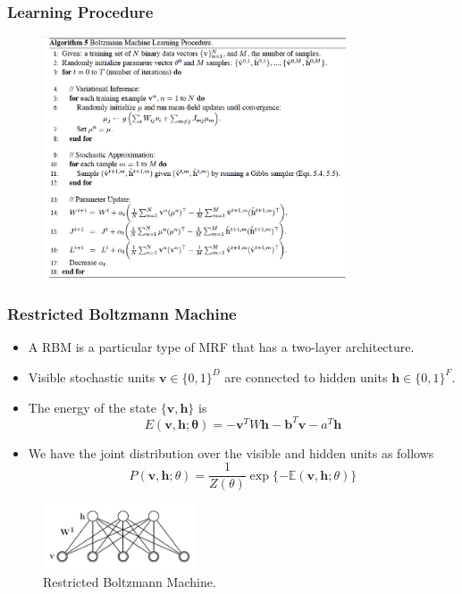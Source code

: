 \documentclass{beamer}
\begin{document}
\begin{frame}
\frametitle{Learning Procedure}
\begin{figure}
\centering
  \includegraphics[width=0.8\textwidth]{figs/learning.png}
\end{figure}
\end{frame}


\begin{frame}
\frametitle{Restricted Boltzmann Machine}
\begin{itemize}
\item A RBM is a particular type of MRF that has a two-layer architecture.
\item Visible stochastic units $\mathbf{v} \in \{0, 1\}^D$ are connected to hidden units $\mathbf{h} \in \{ 0, 1\}^F$.
\item The energy of the state $\{\mathbf{v}, \mathbf{h}\}$ is
\begin{equation}
E(\mathbf{v, h; \theta}) = -\mathbf{v}^T W \mathbf{h} - \mathbf{b}^T\mathbf{v} - a^T\mathbf{h}
\end{equation}
\item We have the joint distribution over the visible and hidden units as follows
\begin{equation}
P(\mathbf{v, h}; \theta) = \frac{1}{Z(\theta)}\exp\{-\mathbb{E}(\mathbf{v, h}; \theta)\}
\end{equation}
\end{itemize}
\begin{figure}
\centering
  \includegraphics[width=0.4\textwidth]{figs/rbm_model.pdf}
  \caption{Restricted Boltzmann Machine.}
\end{figure}
\end{frame}
\end{document}
